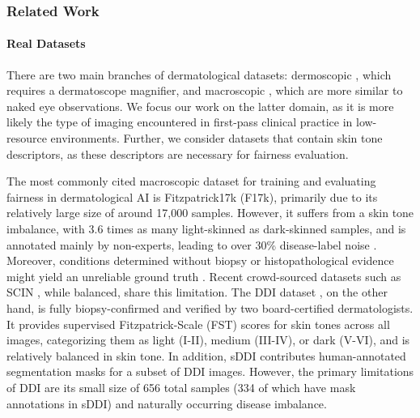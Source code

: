 \documentclass[11pt]{ucthesis}
\begin{document}
\subsubsection{Related Work}

\label{cgddi:sec:related}
\paragraph{Real Datasets} There are two main branches of dermatological datasets: dermoscopic \cite{ham, bcn}, which requires a dermatoscope magnifier, and macroscopic \cite{groh_2021_evaluating, daneshjou_2022_disparities}, which are more similar to naked eye observations. We focus our work on the latter domain, as it is more likely the type of imaging encountered in first-pass clinical practice in low-resource environments. Further, we consider datasets that contain skin tone descriptors, as these descriptors are necessary for fairness evaluation.

The most commonly cited macroscopic dataset for training and evaluating fairness in dermatological AI is Fitzpatrick17k (F17k), primarily due to its relatively large size of around 17,000 samples. However, it suffers from a skin tone imbalance, with 3.6 times as many light-skinned as dark-skinned samples, and is annotated mainly by non-experts, leading to over 30\% disease-label noise \cite{groh_2021_evaluating}. Moreover, conditions determined without biopsy or histopathological evidence might yield an unreliable ground truth \cite{daneshjou_2022_checklist}. Recent crowd-sourced datasets such as SCIN \cite{Jeong6186}, while balanced, share this limitation. The DDI dataset \cite{daneshjou_2022_disparities}, on the other hand, is fully biopsy-confirmed and verified by two board-certified dermatologists. It provides supervised Fitzpatrick-Scale (FST) \cite{fitzpatrick_1988_the} scores for skin tones across all images, categorizing them as light (I-II), medium (III-IV), or dark (V-VI), and is relatively balanced in skin tone. In addition, sDDI \cite{carrion-2023} contributes human-annotated segmentation masks for a subset of DDI images. However, the primary limitations of DDI are its small size of 656 total samples (334 of which have mask annotations in sDDI) and naturally occurring disease imbalance.
\end{document}
